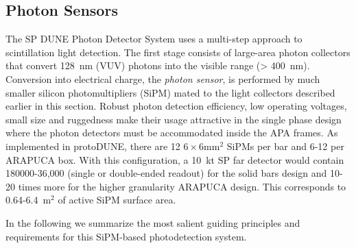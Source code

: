 
\subsection{Photon Sensors}
\label{sec:fdsp-pd-ps}

The SP DUNE Photon Detector System uses a multi-step approach to scintillation light detection.  The first stage consists of large-area photon collectors that convert 128~nm (VUV) photons into the visible range (> 400~nm). Conversion into electrical charge, the {\it photon sensor}, is performed by much smaller
 silicon photomultipliers (SiPM) mated to the light collectors described earlier in this section. Robust photon detection efficiency, low operating voltages, small size and ruggedness make their usage attractive in the single phase design where the photon detectors must be accommodated inside the APA 
frames. As implemented in protoDUNE, there are 12 $6\times6$mm$^2$ SiPMs per bar and 6-12 per ARAPUCA box. With this configuration, a 10~kt SP far detector would contain 180000-36,000 (single or double-ended readout) for the solid bars design and 10-20 times more for the higher granularity ARAPUCA design. This corresponds to 0.64-6.4~m$^2$ of active SiPM surface area.

In the following we summarize the most salient guiding principles and requirements for this SiPM-based photodetection system.

